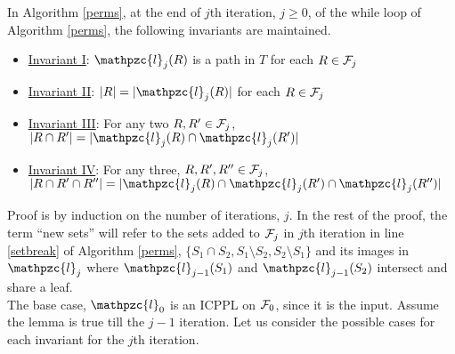 \documentclass{fsttcs}
\def\cF{{\cal F}}
\def\cl{\mathpzc{l}}
\begin{document}
\begin{lemma}
\label{lem:invar1}
  In Algorithm \ref{perms}, at the end of $j$th iteration, $j \ge 0$, of the while loop of 
  Algorithm \ref{perms}, the following invariants are maintained.
\begin{itemize}
\item []\underline {Invariant I}: $\cl_j(R)$ is a path in $T$ for each $R \in \cF_j$
\item []\underline {Invariant II}: $|R| = |\cl_j(R)|$ for each $R \in \cF_j$
\item []\underline {Invariant III}: For any two $R, R' \in \cF_j$,
  $|R \cap R'| = |\cl_j(R) \cap \cl_j(R')|$
\item []\underline {Invariant IV}: For any three, $R, R', R'' \in \cF_j$,
  $|R \cap R' \cap R''|=|\cl_j(R) \cap \cl_j(R') \cap \cl_j(R'')|$
\end{itemize}
\end{lemma}

\proof
  Proof is by induction on the number of iterations, $j$. In the rest
  of the proof, the term ``new sets'' will refer to the sets added
  to $\cF_j$ in $j$th iteration in line \ref{setbreak} of Algorithm
  \ref{perms}, $\{S_1 \cap S_2, S_1 \setminus S_2, S_2 \setminus S_1
  \}$ and its images in $\cl_j$ where $\cl_{j-1}(S_1)$ and
  $\cl_{j-1}(S_2)$
  intersect and share a leaf.\\
  \noindent
  The base case, $\cl_0$ is an ICPPL on $\cF_0$, since it is the
  input.  Assume the lemma is true till the $j-1$ iteration. Let us consider
the possible cases for each invariant for the  $j$th  iteration.
\end{document}
